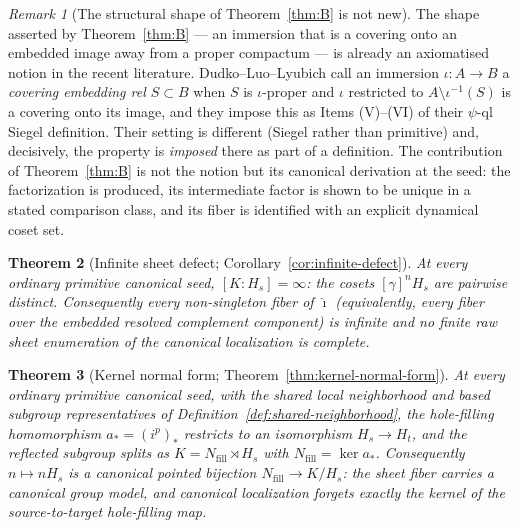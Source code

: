 \documentclass[11pt,reqno]{amsart}
\newtheorem{theorem}{Theorem}[section]
\theoremstyle{definition}
\theoremstyle{remark}
\newtheorem{remark}[theorem]{Remark}
\begin{document}
\begin{remark}[The structural shape of Theorem~\ref{thm:B} is not new]
\label{rem:covering-embedding-prior}
The shape asserted by Theorem~\ref{thm:B} --- an immersion that is a
covering onto an embedded image away from a proper compactum --- is
already an axiomatised notion in the recent literature.
Dudko--Luo--Lyubich \cite[\S2.1]{DLL25} call an immersion
$\iota\colon A\to B$ a \emph{covering embedding rel $S\subset B$} when
$S$ is $\iota$-proper and $\iota$ restricted to
$A\setminus\iota^{-1}(S)$ is a covering onto its image, and they impose
this as Items (V)--(VI) of their $\psi$-ql Siegel definition.  Their
setting is different (Siegel rather than primitive) and, decisively,
the property is \emph{imposed} there as part of a definition.  The
contribution of Theorem~\ref{thm:B} is not the notion but its
canonical derivation at the seed: the factorization is produced,
its intermediate factor is shown to be unique in a stated comparison
class, and its fiber is identified with an explicit dynamical coset
set.
\end{remark}

\begin{theorem}[Infinite sheet defect;
Corollary~\ref{cor:infinite-defect}]\label{thm:C}
At every ordinary primitive canonical seed, $[K:H_{s}]=\infty$:
the cosets $[\gamma]^{n}H_{s}$ are pairwise distinct.  Consequently
every non-singleton fiber of $\widehat\imath$ (equivalently, every
fiber over the embedded resolved complement component) is infinite and
no finite raw
sheet enumeration of the canonical localization is complete.
\end{theorem}

\begin{theorem}[Kernel normal form;
Theorem~\ref{thm:kernel-normal-form}]\label{thm:Cprime}
At every ordinary primitive canonical seed, with the shared local
neighborhood and based subgroup representatives of
Definition~\ref{def:shared-neighborhood}, the hole-filling
homomorphism $a_{*}=(i^{p})_{*}$ restricts to an isomorphism
$H_{s}\to H_{t}$, and the reflected subgroup splits as
$K=N_{\mathrm{fill}}\rtimes H_{s}$ with
$N_{\mathrm{fill}}=\ker a_{*}$.  Consequently $n\mapsto nH_{s}$ is a
canonical pointed bijection $N_{\mathrm{fill}}\to K/H_{s}$: the sheet
fiber carries a canonical group model, and canonical localization
forgets exactly the kernel of the source-to-target hole-filling map.
\end{theorem}
\end{document}
